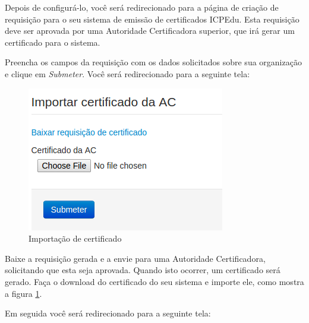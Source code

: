     Depois de configurá-lo, você será redirecionado para a página de criação de requisição para o seu sistema de emissão de certificados ICPEdu. Esta requisição deve ser aprovada por uma Autoridade Certificadora superior, que irá gerar um certificado para o sistema. 

    Preencha os campos da requisição com os dados solicitados sobre sua organização e clique em \textit{Submeter}. Você será redirecionado para a seguinte tela:
    
    \begin{figure}[ht]
     \centering
     \includegraphics[scale=0.6]{images/importacertAC.png}
     \caption{Importação de certificado}
     \label{fig:reqcert}
\end{figure}

    Baixe a requisição gerada e a envie para uma Autoridade Certificadora, solicitando que esta seja aprovada. Quando isto ocorrer, um certificado será gerado. Faça o download do certificado do seu sistema e importe ele, como mostra a figura \ref{fig:reqcert}.
    
    Em seguida você será redirecionado para a seguinte tela:
    
